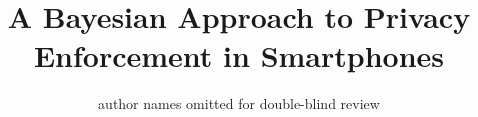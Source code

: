 \documentclass[letterpaper,twocolumn,10pt]{article}
\begin{document}
\date{}


\title{A Bayesian Approach to Privacy Enforcement in Smartphones}
\author{
	{\rm author names omitted for double-blind review}\\
}

\maketitle

















\newpage

\appendix




\end{document}
